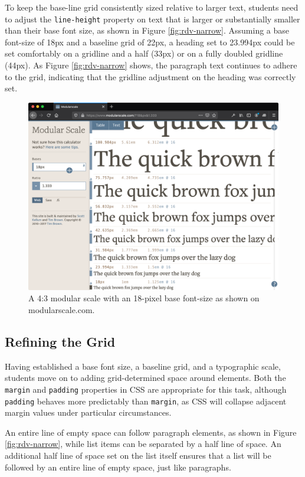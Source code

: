 \documentclass[sigplan,screen]{acmart}
\begin{document}
To keep the base-line grid consistently sized relative to larger text, students need to adjust the \verb|line-height| property on text that is larger or substantially smaller than their base font size, as shown in Figure \ref{fig:rdv-narrow}. Assuming a base font-size of 18px and a baseline grid of 22px, a heading set to 23.994px could be set comfortably on a gridline and a half (33px) or on a fully doubled gridline (44px). As Figure \ref{fig:rdv-narrow} shows, the paragraph text continues to adhere to the grid, indicating that the gridline adjustment on the heading was correctly set.

\begin{figure}
  \includegraphics[width=\linewidth]{modular-scale}
  \caption{A 4:3 modular scale with an 18-pixel base font-size as shown on modularscale.com.}
  \label{fig:modscale}
\end{figure}


\subsection{Refining the Grid}

Having established a base font size, a baseline grid, and a typographic scale, students move on to adding grid-determined space around elements. Both the \verb|margin| and \verb|padding| properties in CSS are appropriate for this task, although \verb|padding| behaves more predictably than \verb|margin|, as CSS will collapse adjacent margin values under particular circumstances.

An entire line of empty space can follow paragraph elements, as shown in Figure \ref{fig:rdv-narrow}, while list items can be separated by a half line of space. An additional half line of space set on the list itself ensures that a list will be followed by an entire line of empty space, just like paragraphs.
\end{document}
